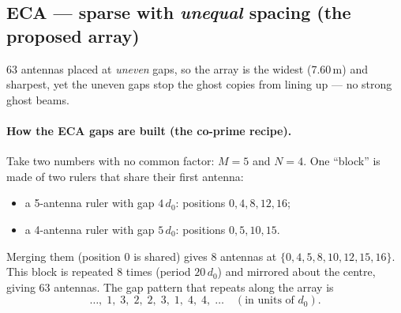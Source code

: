 \documentclass[11pt]{article}
\newcommand{\antrow}[3]{%
  \begin{scope}[xscale=0.075]
  \foreach \x in {#3} {\fill[#1] (\x,0) circle (1.1pt);}
  \end{scope}}
\begin{document}
\subsection{ECA --- sparse with \emph{unequal} spacing (the proposed array)}
63 antennas placed at \emph{uneven} gaps, so the array is the widest (7.60\,m) and sharpest, yet
the uneven gaps stop the ghost copies from lining up --- no strong ghost beams.
\begin{center}
\end{center}

\paragraph{How the ECA gaps are built (the co-prime recipe).}
Take two numbers with no common factor: $M=5$ and $N=4$. One ``block'' is made of two rulers that
share their first antenna:
\begin{itemize}[leftmargin=1.5em,itemsep=1pt]
\item a 5-antenna ruler with gap $4\,d_0$: positions $0,4,8,12,16$;
\item a 4-antenna ruler with gap $5\,d_0$: positions $0,5,10,15$.
\end{itemize}
Merging them (position $0$ is shared) gives 8 antennas at $\{0,4,5,8,10,12,15,16\}$. This block is
repeated 8 times (period $20\,d_0$) and mirrored about the centre, giving 63 antennas. The gap
pattern that repeats along the array is
\[
\dots,\;1,\;3,\;2,\;2,\;3,\;1,\;4,\;4,\;\dots\quad(\text{in units of }d_0).
\]
\begin{center}
\end{center}
\end{document}
